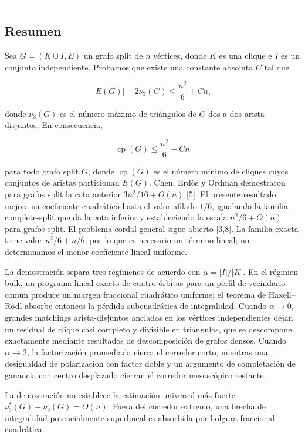 \documentclass[
  spanish,
  11pt,
  a4paper,
]{article}
\begin{document}
\begin{center}\rule{0.5\linewidth}{0.5pt}\end{center}

\subsection{Resumen}\label{resumen}

Sea \(G=(K\cup I,E)\) un grafo split de \(n\) vértices, donde \(K\) es una clique e \(I\) es un conjunto independiente. Probamos que existe una constante absoluta \(C\) tal que

\[
|E(G)|-2\nu_3(G)
\le
\frac{n^2}{6}+Cn,
\]

donde \(\nu_3(G)\) es el número máximo de triángulos de \(G\) dos a dos arista-disjuntos. En consecuencia,

\[
\operatorname{cp}(G)
\le
\frac{n^2}{6}+Cn
\]

para todo grafo split \(G\), donde \(\operatorname{cp}(G)\) es el número mínimo de cliques cuyos conjuntos de aristas particionan \(E(G)\). Chen, Erdős y Ordman demostraron para grafos split la cota anterior \(3n^2/16+O(n)\) {[}5{]}. El presente resultado mejora su coeficiente cuadrático hasta el valor afilado \(1/6\), igualando la familia complete-split que da la cota inferior y estableciendo la escala \(n^2/6+O(n)\) para grafos split. El problema cordal general sigue abierto {[}3,8{]}. La familia exacta tiene valor \(n^2/6+n/6\), por lo que es necesario un término lineal; no determinamos el menor coeficiente lineal uniforme.

La demostración separa tres regímenes de acuerdo con \(\alpha=|I|/|K|\). En el régimen bulk, un programa lineal exacto de cuatro órbitas para un perfil de vecindario común produce un margen fraccional cuadrático uniforme; el teorema de Haxell--Rödl absorbe entonces la pérdida subcuadrática de integralidad. Cuando \(\alpha\to0\), grandes matchings arista-disjuntos anclados en los vértices independientes dejan un residual de clique casi completo y divisible en triángulos, que se descompone exactamente mediante resultados de descomposición de grafos densos. Cuando \(\alpha\to2\), la factorización promediada cierra el corredor corto, mientras una desigualdad de polarización con factor doble y un argumento de completación de ganancia con centro desplazado cierran el corredor mesoscópico restante.

La demostración no establece la estimación universal más fuerte \(\nu_3^*(G)-\nu_3(G)=O(n)\). Fuera del corredor extremo, una brecha de integralidad potencialmente superlineal es absorbida por holgura fraccional cuadrática.
\end{document}

